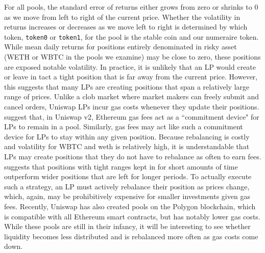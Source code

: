 \documentclass[11pt]{article}
\begin{document}
For all pools, the standard error of returns either grows from zero or shrinks to 0 as we move from left to right of the current price. Whether the volatility in returns increases or decreases as we move left to right is determined by which token, \texttt{token0} or \texttt{token1}, for the pool is the stable coin and our numeraire token. While mean daily returns for positions entirely denominated in risky asset (WETH or WBTC in the pools we examine) may be close to zero, these positions are exposed notable volatility. In practice, it is unlikely that an LP would create or leave in tact a tight position that is far away from the current price. However, this suggests that many LPs are creating positions that span a relatively large range of prices. Unlike a \gls{clob} market where market makers can freely submit and cancel orders, Uniswap LPs incur gas costs whenever they update their positions. \citet{Lehar2021DecentralizedE} suggest that, in Uniswap v2, Ethereum gas fees act as a ``commitment device" for LPs to remain in a pool. Similarly, gas fees may act like such a commitment device for LPs to stay within any given position. Because rebalancing is costly and volatility for WBTC and \gls{weth} is relatively high, it is understandable that LPs may create positions that they do not have to rebalance as often to earn fees. \citet{LambertMedium2} suggests that positions with tight ranges kept in for short amounts of time outperform wider positions that are left for longer periods. To actually execute such a strategy, an LP must actively rebalance their position as prices change, which, again, may be prohibitively expensive for smaller investments given gas fees. Recently, Uniswap has also created pools on the Polygon \gls{blockchain}, which is compatible with all Ethereum smart contracts, but has notably lower gas costs. While these pools are still in their infancy, it will be interesting to see whether liquidity becomes less distributed and is rebalanced more often as gas costs come down.
\end{document}
